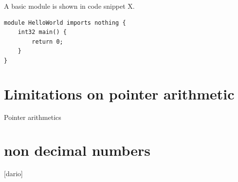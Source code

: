 \documentclass[a4paper,10pt,titlepage]{report}
\begin{document}
A basic module is shown in code snippet X.

\begin{lstlisting}
module HelloWorld imports nothing {
    int32 main() {
		return 0;
	}
}
\end{lstlisting}

\section{Limitations on pointer arithmetic}
Pointer arithmetics 
\section{non decimal numbers}
[dario]
\end{document}
